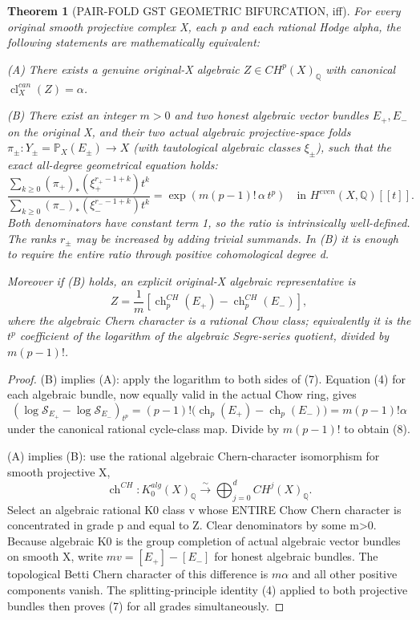 \documentclass[11pt]{article}
\newtheorem{theorem}{Theorem}
\begin{document}
\begin{theorem}[PAIR-FOLD GST GEOMETRIC BIFURCATION, iff]
For every original smooth projective complex X,
each p and each rational Hodge alpha, the following
statements are mathematically equivalent:

(A) There exists a genuine original-X algebraic
$Z\in CH^p(X)_{\mathbb Q}$ with canonical
$\operatorname{cl}^{can}_X(Z)=\alpha$.

(B) There exist an integer $m>0$ and two honest algebraic
vector bundles $E_+,E_-$ on the original X, and their
two actual algebraic projective-space folds
$\pi_\pm:Y_\pm=\mathbb P_X(E_\pm)\to X$
(with tautological algebraic classes $\xi_\pm$),
such that the exact all-degree geometrical equation holds:
\[
 \boxed{
 \frac{\displaystyle\sum_{k\ge0}
      (\pi_+)_*(\xi_+^{r_+-1+k})t^k}
      {\displaystyle\sum_{k\ge0}
      (\pi_-)_*(\xi_-^{r_--1+k})t^k}
 =\exp\!\left(m(p-1)!\,\alpha\,t^p\right)
 \quad\text{in }H^{even}(X,\mathbb Q)[[t]].
 }                                                        \tag{7}
\]
Both denominators have constant term 1, so the ratio
is intrinsically well-defined. The ranks $r_\pm$
may be increased by adding trivial summands.
In (B) it is enough to require the entire ratio
through positive cohomological degree d.

Moreover if (B) holds, an explicit original-X algebraic
representative is
\[
 \boxed{
 Z=\frac1m\left[
 \operatorname{ch}_p^{CH}(E_+)
   -\operatorname{ch}_p^{CH}(E_-)\right],
 }                                                        \tag{8}
\]
where the algebraic Chern character is a rational
Chow class; equivalently it is the $t^p$
coefficient of the logarithm of the algebraic
Segre-series quotient, divided by $m(p-1)!$.
\end{theorem}
\begin{proof}
(B) implies (A): apply the logarithm to both sides
of (7). Equation (4) for each algebraic bundle,
now equally valid in the actual Chow ring, gives
\[
 (\log\mathcal S_{E_+}-\log\mathcal S_{E_-})_{t^p}
 =(p-1)!\bigl(\operatorname{ch}_p(E_+)
                    -\operatorname{ch}_p(E_-)\bigr)
 =m(p-1)!\alpha
\]
under the canonical rational cycle-class map.
Divide by $m(p-1)!$ to obtain (8).

(A) implies (B): use the rational algebraic
Chern-character isomorphism for smooth projective X,
\[
 \operatorname{ch}^{CH}:K_0^{alg}(X)_{\mathbb Q}
          \overset{\sim}{\longrightarrow}
          \bigoplus_{j=0}^d CH^j(X)_{\mathbb Q}.
\]
Select an algebraic rational K0 class v whose ENTIRE
Chow Chern character is concentrated in grade p
and equal to Z. Clear denominators by some m>0.
Because algebraic K0 is the group completion of
actual algebraic vector bundles on smooth X,
write $m v=[E_+]-[E_-]$ for honest algebraic
bundles. The topological Betti Chern character
of this difference is $m\alpha$ and all other
positive components vanish. The splitting-principle
identity (4) applied to both projective bundles
then proves (7) for all grades simultaneously.
\end{proof}
\end{document}
